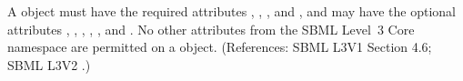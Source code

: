 A \Species object must have the required attributes ,
, ,
 and , and may have the optional
attributes , , ,
, , 
and .  No other attributes from the SBML Level~3
Core namespace are permitted on a \Species object.  (References: SBML L3V1 Section 4.6; SBML L3V2
.)
